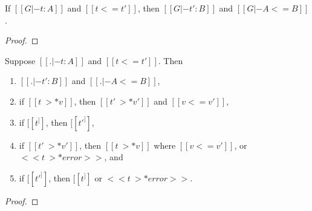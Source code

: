 \begin{lemma}
  \label{lemma:gradual_guarantee_part_one}
  If $[[G |- t : A]]$ and $[[t <= t']]$, then $[[G |- t' : B]]$ and $[[G |- A <= B]]$.
\end{lemma}
\begin{proof}
  
\end{proof}

\begin{theorem}
  \label{thm:gradual_guarantee}
  Suppose $[[. |- t : A]]$ and $[[t <= t']]$.  Then
  \begin{enumerate}[label=\roman*., align=left]     
  \item $[[. |- t' : B]]$ and $[[. |- A <= B]]$,
  \item if $[[t ~>* v]]$, then $[[t' ~>* v']]$ and $[[v <= v']]$,
  \item if $[[t ^]]$, then $[[t' ^]]$,
  \item if $[[t' ~>* v']]$, then $[[t ~>* v]]$ where $[[v <= v']]$, or $<<t ~>* error>>$, and
  \item if $[[t' ^]]$, then $[[t ^]]$ or $<<t ~>* error>>$.
  \end{enumerate}
\end{theorem}
\begin{proof}
  
\end{proof}
